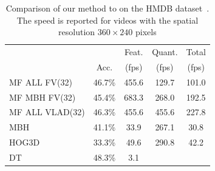\documentclass[10pt,twocolumn,letterpaper]{article}
\begin{document}
\begin{table}
\begin{center}
\begin{tabular}{|l|c|c|c|c|}
\hline
		 				&  	 		& Feat.                    & Quant. 	& Total	\\
		 				& Acc.		& (fps)                    & (fps) 	& (fps)	\\\hline
MF ALL FV(32)		& 46.7\% 	& 455.6                    & 129.7 	& 101.0	\\ %
MF MBH FV(32)		& 45.4\% 	& 683.3                    & 268.0 	& 192.5	\\ %
MF ALL VLAD(32) & 46.3\%	& 455.6								& 455.6		& 227.8	\\ %
\hline
MBH \cite{Feng13}		& 41.1\% 	& 33.9            	     	& 267.1 & 30.8	\\ %
HOG3D \cite{Feng13}	& 33.3\% 	& 49.6            	   	& 290.8 & 42.2	\\ %
DT	\cite{Wang12}			& 48.3\%& 3.1								&			& \\ %
\hline
\end{tabular}
\smallskip
\caption{Comparison of our method to \cite{Feng13} on the HMDB dataset~\cite{Kuehne11}. The speed is reported for videos with the spatial resolution $360\times 240$ pixels}
\label{tab:hmdb_comparison}
\mbox{}\vspace{-1cm}\\
\end{center}
\end{table}


\end{document}
